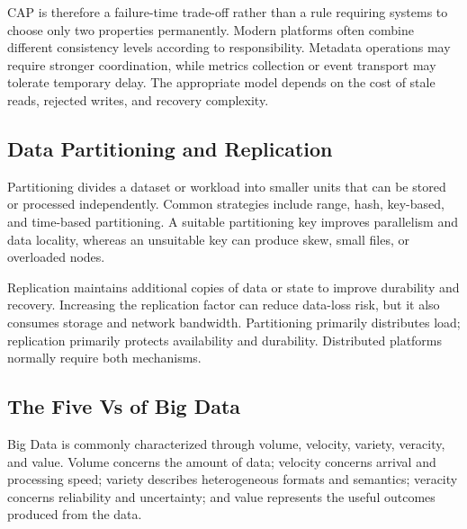 CAP is therefore a failure-time trade-off rather than a rule requiring systems to choose only two properties permanently. Modern platforms often combine different consistency levels according to responsibility. Metadata operations may require stronger coordination, while metrics collection or event transport may tolerate temporary delay. The appropriate model depends on the cost of stale reads, rejected writes, and recovery complexity.

\subsection{Data Partitioning and Replication}
Partitioning divides a dataset or workload into smaller units that can be stored or processed independently. Common strategies include range, hash, key-based, and time-based partitioning. A suitable partitioning key improves parallelism and data locality, whereas an unsuitable key can produce skew, small files, or overloaded nodes.

Replication maintains additional copies of data or state to improve durability and recovery. Increasing the replication factor can reduce data-loss risk, but it also consumes storage and network bandwidth. Partitioning primarily distributes load; replication primarily protects availability and durability. Distributed platforms normally require both mechanisms.

\subsection{The Five Vs of Big Data}
Big Data is commonly characterized through volume, velocity, variety, veracity, and value. Volume concerns the amount of data; velocity concerns arrival and processing speed; variety describes heterogeneous formats and semantics; veracity concerns reliability and uncertainty; and value represents the useful outcomes produced from the data.

